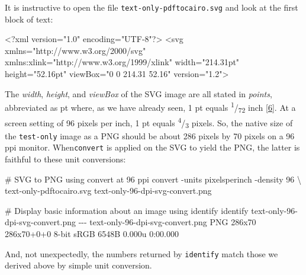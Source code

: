 \documentclass[
  12pt,
  british,
  a4paper,
  rgb,
  dvipsnames,
  svgnames,
  hyphens]{article}
\newenvironment{Shaded}{\begin{snugshade}}{\end{snugshade}}
\newcommand{\AttributeTok}[1]{\textcolor[rgb]{0.80,0.80,0.80}{#1}}
\newcommand{\CommentTok}[1]{\textcolor[rgb]{0.50,0.62,0.50}{#1}}
\newcommand{\DataTypeTok}[1]{\textcolor[rgb]{0.87,0.87,0.75}{#1}}
\newcommand{\ErrorTok}[1]{\textcolor[rgb]{0.76,0.75,0.62}{#1}}
\newcommand{\ExtensionTok}[1]{\textcolor[rgb]{0.80,0.80,0.80}{#1}}
\newcommand{\KeywordTok}[1]{\textcolor[rgb]{0.94,0.87,0.69}{#1}}
\newcommand{\NormalTok}[1]{\textcolor[rgb]{0.80,0.80,0.80}{#1}}
\newcommand{\OtherTok}[1]{\textcolor[rgb]{0.94,0.94,0.56}{#1}}
\newcommand{\StringTok}[1]{\textcolor[rgb]{0.80,0.58,0.58}{#1}}
\begin{document}
It is instructive to open the file \texttt{text-only-pdftocairo.svg} and
look at the first block of text:

\begin{Shaded}
\begin{Highlighting}[]
\KeywordTok{\textless{}?xml}\NormalTok{ version="1.0" encoding="UTF{-}8"}\KeywordTok{?\textgreater{}}
\KeywordTok{\textless{}svg} \ErrorTok{xmlns}\OtherTok{=}\StringTok{"http://www.w3.org/2000/svg"} \ErrorTok{xmlns:xlink}\OtherTok{=}\StringTok{"http://www.w3.org/1999/xlink"} \ErrorTok{width}\OtherTok{=}\StringTok{"214.31pt"} \ErrorTok{height}\OtherTok{=}\StringTok{"52.16pt"} \ErrorTok{viewBox}\OtherTok{=}\StringTok{"0 0 214.31 52.16"} \ErrorTok{version}\OtherTok{=}\StringTok{"1.2"}\KeywordTok{\textgreater{}}
\end{Highlighting}
\end{Shaded}

The \emph{width}, \emph{height}, and \emph{viewBox} of the SVG image are
all stated in \emph{points}, abbreviated as pt where, as we have already
seen, 1 pt equals \textsuperscript{1}/\textsubscript{72} inch
\protect\hyperlink{ref-oreilly2019}{{[}6{]}}. At a screen setting of 96
pixels per inch, 1 pt equals \textsuperscript{4}/\textsubscript{3}
pixels. So, the native size of the \texttt{test-only} image as a PNG
should be about 286 pixels by 70 pixels on a 96 ppi monitor.
When\texttt{convert} is applied on the SVG to yield the PNG, the latter
is faithful to these unit conversions:

\begin{Shaded}
\begin{Highlighting}[]
\CommentTok{\# SVG to PNG using \textasciigrave{}convert\textasciigrave{} at 96 ppi}
\ExtensionTok{convert} \AttributeTok{{-}units}\NormalTok{ pixelsperinch }\AttributeTok{{-}density}\NormalTok{ 96 }\DataTypeTok{\textbackslash{}}
\NormalTok{text{-}only{-}pdftocairo.svg text{-}only{-}96{-}dpi{-}svg{-}convert.png}

\CommentTok{\# Display basic information about an image using \textasciigrave{}identify\textasciigrave{}}
\ExtensionTok{identify}\NormalTok{ text{-}only{-}96{-}dpi{-}svg{-}convert.png}
\ExtensionTok{{-}{-}{-}}
\ExtensionTok{text{-}only{-}96{-}dpi{-}svg{-}convert.png}\NormalTok{ PNG 286x70 286x70+0+0 8{-}bit sRGB 6548B 0.000u 0:00.000}
\end{Highlighting}
\end{Shaded}

And, not unexpectedly, the numbers returned by \texttt{identify} match
those we derived above by simple unit conversion.
\normalfont
\end{document}
